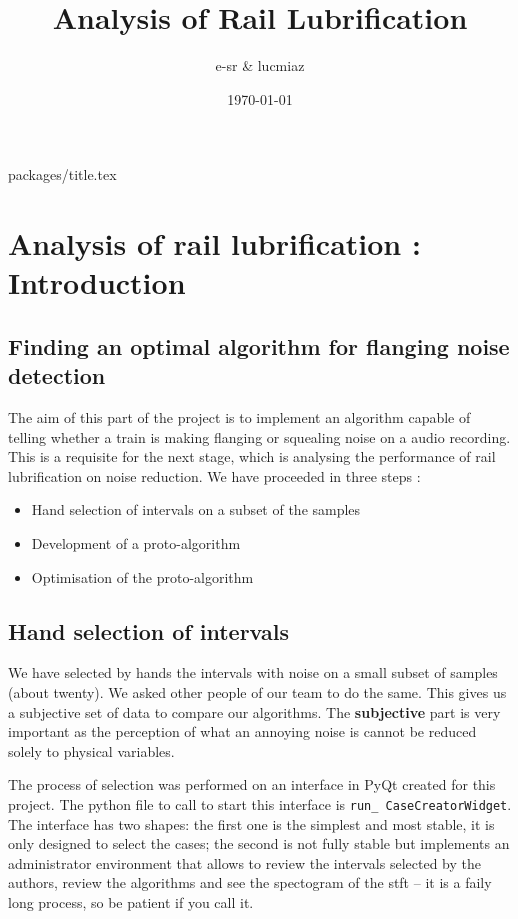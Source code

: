 \documentclass{article}\usepackage[]{graphicx}\usepackage[]{color}
\author{e-sr \& lucmiaz}
\date{\today}
\title{Analysis of Rail Lubrification}
\begin{document}
{packages/title.tex}

\tableofcontents
\newpage
\section{Analysis of rail lubrification : Introduction}

\subsection{\label{sec:algtest}Finding an optimal algorithm for flanging noise detection}
The aim of this part of the project is to implement an algorithm capable of telling whether a train is making flanging or squealing noise on a audio recording. This is a requisite for the next stage, which is analysing the performance of rail lubrification on noise reduction. We have proceeded in three steps :
\begin{itemize}
\item Hand selection of intervals on a subset of the samples

\item Development of a proto-algorithm

\item Optimisation of the proto-algorithm
\end{itemize}

\subsection{Hand selection of intervals}
We have selected by hands the intervals with noise on a small subset of samples (about twenty). We asked other people of our team to do the same. This gives us a subjective set of data to compare our algorithms. The {\bf subjective} part is very important as the perception of what an annoying noise is cannot be reduced solely to physical variables.

The process of selection was performed on an interface in PyQt created for this project. The python file to call to start this interface is {\tt run\_ CaseCreatorWidget}. The interface has two shapes: the first one is the simplest and most stable, it is only designed to select the cases; the second is not fully stable but implements an administrator environment that allows to review the intervals selected by the authors, review the algorithms and see the spectogram of the stft -- it is a faily long process, so be patient if you call it. 
\end{document}
